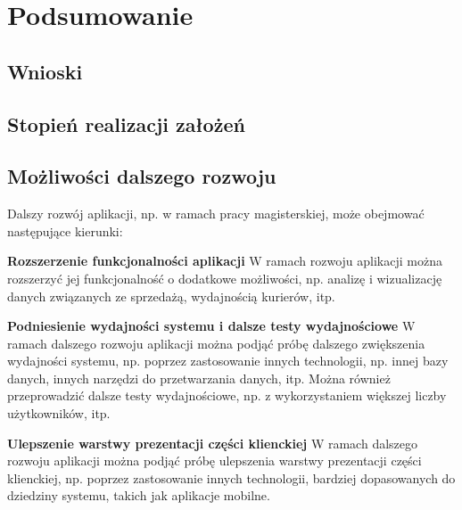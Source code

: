 \clearpage %

\section{Podsumowanie}

\subsection{Wnioski}

\subsection{Stopień realizacji założeń}

\subsection{Możliwości dalszego rozwoju}

Dalszy rozwój aplikacji, np. w ramach pracy magisterskiej, może obejmować następujące kierunki:

\textbf{Rozszerzenie funkcjonalności aplikacji} W ramach rozwoju aplikacji można rozszerzyć jej funkcjonalność o dodatkowe możliwości, np. analizę i wizualizację danych związanych ze sprzedażą, wydajnością kurierów, itp.

\textbf{Podniesienie wydajności systemu i dalsze testy wydajnościowe} W ramach dalszego rozwoju aplikacji można podjąć próbę dalszego zwiększenia wydajności systemu, np. poprzez zastosowanie innych technologii, np. innej bazy danych, innych narzędzi do przetwarzania danych, itp. Można również przeprowadzić dalsze testy wydajnościowe, np. z wykorzystaniem większej liczby użytkowników, itp. 

\textbf{Ulepszenie warstwy prezentacji części klienckiej} W ramach dalszego rozwoju aplikacji można podjąć próbę ulepszenia warstwy prezentacji części klienckiej, np. poprzez zastosowanie innych technologii, bardziej dopasowanych do dziedziny systemu, takich jak aplikacje mobilne. 